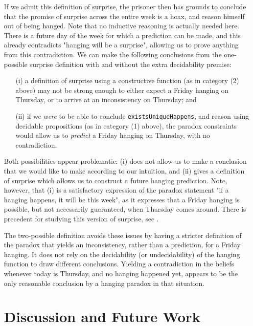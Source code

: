 \documentclass[runningheads]{llncs}
\begin{document}
If we admit this definition of surprise, the prisoner then has grounds to conclude that
the promise of surprise across the entire week is a hoax, and reason himself out of being hanged.
Note that no inductive reasoning is actually needed here. There is a future day
of the week for which a prediction can be made, and this already contradicts
"hanging will be a surprise", allowing us to prove anything from this contradiction.
We can make the following conclusions from the one-possible surprise definition
with and without the extra decidability premise:

\begin{itemize}
  \item[(i)] a definition of surprise using a constructive function (as in category
  (2) above)
  may not be strong enough to either expect
  a Friday hanging on Thursday, or to arrive at an inconsistency
  on Thursday; and \newline

  \item[(ii)] if we \emph{were} to be able to conclude {\tt existsUniqueHappens},
  and reason using decidable propositions (as in category (1) above), the paradox
  constraints would allow us to \emph{predict} a Friday hanging on Thursday,
  with no contradiction.
\end{itemize}

Both possibilities appear problematic: (i) does not allow us to make
a conclusion that we would like to make according to our intuition,
and (ii) gives a definition of surprise which allows us to construct a future
hanging prediction. Note, however, that (i) is a satisfactory expression
of the paradox statement "if a hanging happens, it will be this week", as it
expresses that a Friday hanging is possible, but not necessarily guaranteed, when Thursday
comes around. There is precedent for studying this version of surprise, see
\cite{conditional}.

The two-possible definition avoids these issues by having a stricter definition
of the paradox that yields an inconsistency, rather than a prediction, for a
Friday hanging. It does not rely on the decidability (or undecidability) of the
hanging function to draw different conclusions. Yielding a contradiction
in the beliefs whenever today is Thursday, and no hanging happened yet, appears to
be the only reasonable conclusion by a hanging paradox in that situation.

\section{Discussion and Future Work}
\end{document}
